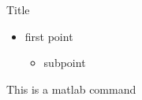 \documentclass{beamer}
\begin{document}
\begin{frame}[fragile]{Title}
\beamerdefaultoverlayspecification{<+->}
\begin{itemize}
    \item first point
    \begin{itemize}
        \item subpoint
    \end{itemize}
\end{itemize}
\begin{myMPcolor}
This is a matlab command
\end{myMPcolor}
\end{frame}
\end{document}
